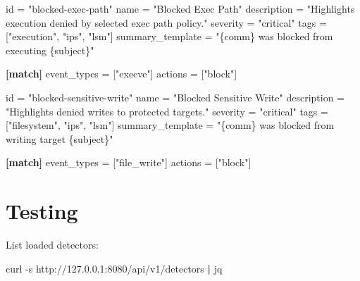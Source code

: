 \documentclass[
  12pt,
]{report}
\newenvironment{Shaded}{}{}
\newcommand{\AttributeTok}[1]{\textcolor[rgb]{0.49,0.56,0.16}{#1}}
\newcommand{\DataTypeTok}[1]{\textcolor[rgb]{0.56,0.13,0.00}{#1}}
\newcommand{\ExtensionTok}[1]{#1}
\newcommand{\KeywordTok}[1]{\textcolor[rgb]{0.00,0.44,0.13}{\textbf{#1}}}
\newcommand{\NormalTok}[1]{#1}
\newcommand{\OperatorTok}[1]{\textcolor[rgb]{0.40,0.40,0.40}{#1}}
\newcommand{\StringTok}[1]{\textcolor[rgb]{0.25,0.44,0.63}{#1}}
\begin{document}
\begin{Shaded}
\begin{Highlighting}[]
\DataTypeTok{id} \OperatorTok{=} \StringTok{"blocked{-}exec{-}path"}
\DataTypeTok{name} \OperatorTok{=} \StringTok{"Blocked Exec Path"}
\DataTypeTok{description} \OperatorTok{=} \StringTok{"Highlights execution denied by selected exec path policy."}
\DataTypeTok{severity} \OperatorTok{=} \StringTok{"critical"}
\DataTypeTok{tags} \OperatorTok{=} \OperatorTok{[}\StringTok{"execution"}\OperatorTok{,} \StringTok{"ips"}\OperatorTok{,} \StringTok{"lsm"}\OperatorTok{]}
\DataTypeTok{summary\_template} \OperatorTok{=} \StringTok{"\{comm\} was blocked from executing \{subject\}"}

\KeywordTok{[match]}
\DataTypeTok{event\_types} \OperatorTok{=} \OperatorTok{[}\StringTok{"execve"}\OperatorTok{]}
\DataTypeTok{actions} \OperatorTok{=} \OperatorTok{[}\StringTok{"block"}\OperatorTok{]}
\end{Highlighting}
\end{Shaded}

\begin{Shaded}
\begin{Highlighting}[]
\DataTypeTok{id} \OperatorTok{=} \StringTok{"blocked{-}sensitive{-}write"}
\DataTypeTok{name} \OperatorTok{=} \StringTok{"Blocked Sensitive Write"}
\DataTypeTok{description} \OperatorTok{=} \StringTok{"Highlights denied writes to protected targets."}
\DataTypeTok{severity} \OperatorTok{=} \StringTok{"critical"}
\DataTypeTok{tags} \OperatorTok{=} \OperatorTok{[}\StringTok{"filesystem"}\OperatorTok{,} \StringTok{"ips"}\OperatorTok{,} \StringTok{"lsm"}\OperatorTok{]}
\DataTypeTok{summary\_template} \OperatorTok{=} \StringTok{"\{comm\} was blocked from writing target \{subject\}"}

\KeywordTok{[match]}
\DataTypeTok{event\_types} \OperatorTok{=} \OperatorTok{[}\StringTok{"file\_write"}\OperatorTok{]}
\DataTypeTok{actions} \OperatorTok{=} \OperatorTok{[}\StringTok{"block"}\OperatorTok{]}
\end{Highlighting}
\end{Shaded}

\section{Testing}\label{testing}

List loaded detectors:

\begin{Shaded}
\begin{Highlighting}[]
\ExtensionTok{curl} \AttributeTok{{-}s}\NormalTok{ http://127.0.0.1:8080/api/v1/detectors }\KeywordTok{|} \ExtensionTok{jq}
\end{Highlighting}
\end{Shaded}
\end{document}
